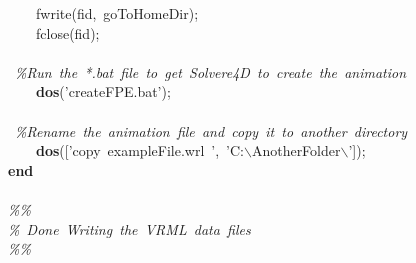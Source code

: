 \documentclass[singlecolumn,12pt]{article}
\newcommand{\hlstd}[1]{\textcolor[rgb]{0,0,0}{#1}}
\newcommand{\hlkey}[1]{\textcolor[rgb]{0,0,1}{\bf{#1}}}
\newcommand{\hltyp}[1]{\textcolor[rgb]{0,0,1}{#1}}
\newcommand{\hlcom}[1]{\textcolor[rgb]{0.4,0.4,0.4}{\it{#1}}}
\begin{document}
{\hlstd{\ \ \ \ }}\hltyp{fwrite}\hlstd{(fid,\ goToHomeDir);\\
\hlstd{\ \ \ \ }}\hltyp{fclose}\hlstd{(fid);\mbox{}\\
\\
\ }\hlcom{\%Run\ the\ *.bat\ file\ to\ get\ Solvere4D\ to\ create\ the\ animation\\
}\hlstd{\hlstd{\ \ \ \ }}\hlkey{dos}\hlstd{('createFPE.bat');\mbox{}\\
\\
\ }\hlcom{\%Rename\ the\ animation\ file\ and\ copy\ it\ to\ another\ directory\\
}\hlstd{\hlstd{\ \ \ \ }}\hlkey{dos}\hlstd{(['copy\ exampleFile.wrl\ ',\ 'C:$\backslash$AnotherFolder$\backslash$']);\\
}\hlkey{end\mbox{}\\
\\
}\hlstd{}\hlcom{\%\%\\
}\hlstd{}\hlcom{\%\ Done\ Writing\ the\ VRML\ data\ files\\
}\hlstd{}\hlcom{\%\%}\hlstd{}\\
\mbox{}\\
\normalfont
\end{document}
